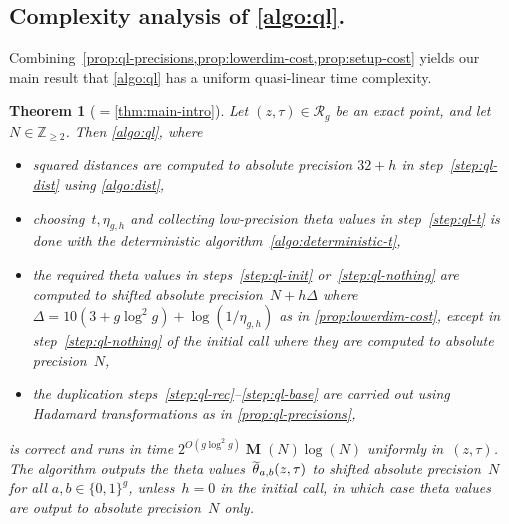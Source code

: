 \documentclass[12pt,oneside]{amsart}
\numberwithin{equation}{section}
\newtheorem{thm}[equation]{Theorem}
\theoremstyle{definition}
\newcommand{\Z}{\mathbb{Z}}
\newcommand{\red}{\mathcal{R}}
\DeclareMathOperator{\thetatilde}{\rlap{\raisebox{-0.1ex}{$\widetilde{\phantom{\,t}}$}}\theta}
\DeclareMathOperator{\Mul}{\mathbf{M}}
\begin{document}
\subsection{Complexity analysis of \texorpdfstring{\cref{algo:ql}}{the fast algorithm}.}
\label{subsec:complexity}

Combining~\cref{prop:ql-precisions,prop:lowerdim-cost,prop:setup-cost} yields
our main result that \cref{algo:ql} has a uniform quasi-linear time complexity.

\begin{thm}[{$={}$\cref{thm:main-intro}}]
  \label{thm:ql-complexity}
  Let $(z,\tau)\in \red_g$ be an exact point, and let~$N\in \Z_{\geq 2}$. Then
  \cref{algo:ql}, where
  \begin{itemize}
  \item squared distances are computed to absolute precision $32+h$ in
    step~\eqref{step:ql-dist} using \cref{algo:dist},
  \item choosing~$t,\eta_{g,h}$ and collecting low-precision theta values in
    step~\eqref{step:ql-t} is done with the deterministic
    algorithm~\ref{algo:deterministic-t},
  \item the required theta values in steps~\eqref{step:ql-init}
    or~\eqref{step:ql-nothing} are computed to shifted absolute
    precision~$N+h\Delta$ where~$\Delta = 10(3+g\log^2 g) + \log(1/\eta_{g,h})$
    as in \cref{prop:lowerdim-cost}, except in step~\eqref{step:ql-nothing} of
    the initial call where they are computed to absolute precision~$N$,
  \item the duplication steps~\eqref{step:ql-rec}--\eqref{step:ql-base} are
    carried out using Hadamard transformations as in \cref{prop:ql-precisions},
  \end{itemize}
  is correct and runs in time $2^{O(g\log^2 g)} \Mul(N) \log(N)$ uniformly
  in~$(z,\tau)$. The algorithm outputs the theta
  values~$\thetatilde_{a,b}(z,\tau)$ to shifted absolute precision~$N$ for all
  $a,b\in \{0,1\}^g$, unless~$h=0$ in the initial call, in which case theta
  values are output to absolute precision~$N$ only.
\end{thm}
\end{document}
